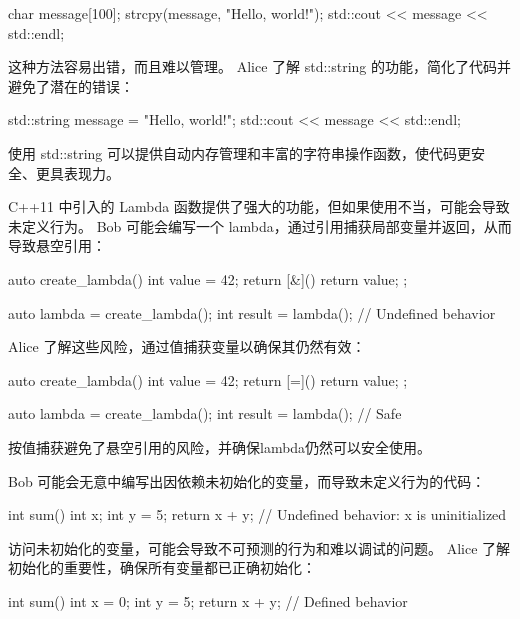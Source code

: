 \begin{cpp}
char message[100];
strcpy(message, "Hello, world!");
std::cout << message << std::endl;
\end{cpp}

这种方法容易出错，而且难以管理。 Alice 了解 std::string 的功能，简化了代码并避免了潜在的错误：

\begin{cpp}
std::string message = "Hello, world!";
std::cout << message << std::endl;
\end{cpp}

使用 std::string 可以提供自动内存管理和丰富的字符串操作函数，使代码更安全、更具表现力。


C++11 中引入的 Lambda 函数提供了强大的功能，但如果使用不当，可能会导致未定义行为。 Bob 可能会编写一个 lambda，通过引用捕获局部变量并返回，从而导致悬空引用：

\begin{cpp}
auto create_lambda() {
    int value = 42;
    return [&]() { return value; };
}

auto lambda = create_lambda();
int result = lambda(); // Undefined behavior
\end{cpp}

Alice 了解这些风险，通过值捕获变量以确保其仍然有效：

\begin{cpp}
auto create_lambda() {
    int value = 42;
    return [=]() { return value; };
}

auto lambda = create_lambda();
int result = lambda(); // Safe
\end{cpp}

按值捕获避免了悬空引用的风险，并确保lambda仍然可以安全使用。


Bob 可能会无意中编写出因依赖未初始化的变量，而导致未定义行为的代码：

\begin{cpp}
int sum() {
    int x;
    int y = 5;
    return x + y; // Undefined behavior: x is uninitialized
}
\end{cpp}

访问未初始化的变量，可能会导致不可预测的行为和难以调试的问题。 Alice 了解初始化的重要性，确保所有变量都已正确初始化：

\begin{cpp}
int sum() {
    int x = 0;
    int y = 5;
    return x + y; // Defined behavior
}
\end{cpp}

